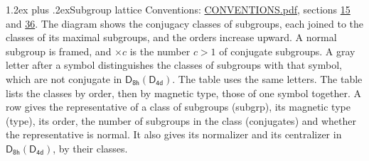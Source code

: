 \documentclass[10pt,a4paper]{article}
\makeatletter
\renewcommand\section{\@startsection{section}{1}{\z@}{-3ex plus -1ex minus -.2ex}%
  {1.2ex plus .2ex}{\normalfont\large\sffamily\bfseries\color{parttitle}}}
\numberwithin{equation}{section}
\newcommand{\grp}[1]{\mathsf{#1}}
\makeatother
\begin{document}
\section{Subgroup lattice}\label{s:subgroups}
Conventions: \href{../../CONVENTIONS.pdf}{CONVENTIONS.pdf}, sections \href{../../../rotation/CONVENTIONS.pdf\#conv.15}{15} and \href{../../CONVENTIONS.pdf\#conv.36}{36}.
The diagram shows the conjugacy classes of subgroups, each joined to the classes of its maximal subgroups, and the orders increase upward. \label{n:index.conjugates.c}\label{n:mark.conjugates}A normal subgroup is framed, and ${\times}c$ is the number $c > 1$ of conjugate subgroups. \label{n:mark.letter}A gray letter after a symbol distinguishes the classes of subgroups with that symbol, which are not conjugate in $\grp{D_{8h}}(\grp{D_{4d}})$. The table uses the same letters. The table lists the classes by order, then by magnetic type, those of one symbol together. \label{n:head.subgroup}\label{n:head.magnetic.type}\label{n:head.order}\label{n:head.conjugates}\label{n:head.normal}A row gives the representative of a class of subgroups (subgrp), its magnetic type (type), its order, the number of subgroups in the class (conjugates) and whether the representative is normal. \label{n:head.normalizer}\label{n:head.centralizer}It also gives its normalizer and its centralizer in $\grp{D_{8h}}(\grp{D_{4d}})$, by their classes. 
\end{document}
